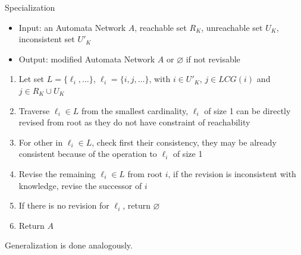 \documentclass[8pt]{beamer}
\begin{document}
\begin{frame}{Specialization}
    \begin{itemize}
        \item Input: an Automata Network $A$, reachable set $R_K$, unreachable set $U_K$, inconsistent set $U'_K$
        \item Output: modified Automata Network $A$ or $\varnothing$ if not revisable
    \end{itemize}
    \begin{enumerate}
        \item Let set $L=\{\ell_i,\ldots\}$, $\ell_i=\{i,j,\ldots\}$, with $i\in U'_K$, $j\in LCG(i)$ and $ j\in R_K\cup U_K $ 
        \item Traverse $\ell_i\in L$ from the smallest cardinality, $\ell_i$ of size 1 can be directly revised from root as they do not have constraint of reachability
        \item For other in $\ell_i\in L$, check first their consistency, they may be already consistent because of the operation to $\ell_i$ of size 1
        \item Revise the remaining $\ell_i\in L$ from root $i$, if the revision is inconsistent with knowledge, revise the successor of $i$
        \item If there is no revision for $\ell_i$, return $\varnothing$
        \item Return $A$
    \end{enumerate}
    Generalization is done analogously.
\end{frame}
\end{document}
